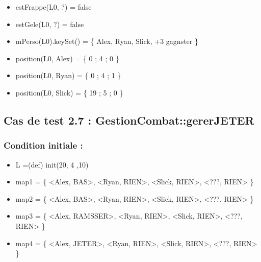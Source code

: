 \documentclass[11pt]{article}
\begin{document}
\begin{itemize}

\item estFrappe(L0, ?) = false\\
\label{sec-1.8.3.1}


\item estGele(L0, ?) = false\\
\label{sec-1.8.3.2}


\item mPerso(L0).keySet() = \{ Alex, Ryan, Slick, +3 gagnster \}\\
\label{sec-1.8.3.3}


\item position(L0, Alex) = \{ 0 ; 4 ; 0 \}\\
\label{sec-1.8.3.4}


\item position(L0, Ryan) = \{ 0 ; 4 ; 1 \}\\
\label{sec-1.8.3.5}


\item position(L0, Slick) = \{ 19 ; 5 ; 0 \}\\
\label{sec-1.8.3.6}



\end{itemize} %
\subsection{Cas de test 2.7 : GestionCombat::gererJETER}
\label{sec-1.9}

\subsubsection{Condition initiale :}
\label{sec-1.9.1}

\begin{itemize}

\item L =(def) init(20, 4 ,10)\\
\label{sec-1.9.1.1}


\item map1 = \{ <Alex, BAS>, <Ryan, RIEN>, <Slick, RIEN>, <???, RIEN> \}\\
\label{sec-1.9.1.2}


\item map2 = \{ <Alex, BAS>, <Ryan, RIEN>, <Slick, RIEN>, <???, RIEN> \}\\
\label{sec-1.9.1.3}


\item map3 = \{ <Alex, RAMSSER>, <Ryan, RIEN>, <Slick, RIEN>, <???, RIEN> \}\\
\label{sec-1.9.1.4}


\item map4 = \{ <Alex, JETER>, <Ryan, RIEN>, <Slick, RIEN>, <???, RIEN> \}\\
\label{sec-1.9.1.5}

\end{itemize} %
\end{document}
